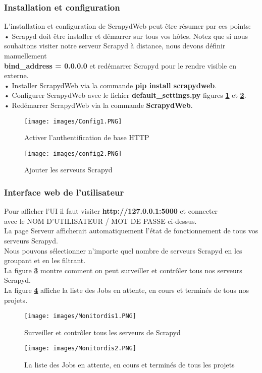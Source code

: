 \subsubsection{Installation et configuration}
\noindent L'installation et configuration de ScrapydWeb peut être résumer par ces points:\\
\indent• Scrapyd doit être installer et démarrer sur tous vos hôtes. Notez que si nous souhaitons \indent visiter notre serveur Scrapyd à distance, nous devons définir manuellement \\\indent\textbf{bind\_address = 0.0.0.0} et redémarrer Scrapyd pour le rendre visible en externe.\\
\indent• Installer ScrapydWeb via la commande \textbf{pip install scrapydweb}.\\
\indent• Configurer ScrapydWeb avec le fichier \textbf{default\_settings.py} figures \textbf{\ref{fig:config1}} et \textbf{\ref{fig:config2}}.\\
\indent• Redémarrer ScrapydWeb via la commande \textbf{ScrapydWeb}.\\
\begin{figure}[H]
    \centering
    \texttt{[image: images/Config1.PNG]}
    \caption{Activer l'authentification de base HTTP}
    \label{fig:config1}  
    \end{figure}
\begin{figure}[H]
    \centering
    \texttt{[image: images/config2.PNG]}
    \caption{Ajouter les serveurs Scrapyd}
    \label{fig:config2}  
    \end{figure}
    
\subsubsection{Interface web de l'utilisateur}
Pour afficher l'UI il faut visiter \textbf{http://127.0.0.1:5000} et connecter\\ avec le NOM D'UTILISATEUR / MOT DE PASSE ci-dessus.\\
La page Serveur afficherait automatiquement l'état de fonctionnement de tous vos serveurs Scrapyd.\\
Nous pouvons sélectionner n'importe quel nombre de serveurs Scrapyd en les groupant et en les filtrant.\\
La figure \textbf{\ref{fig:surveiller}} montre comment on peut surveiller et contrôler tous nos serveurs Scrapyd.\\
La figure \textbf{\ref{fig:Liste}} affiche la liste des Jobs en attente, en cours et terminés de tous nos projets.
\begin{figure}[H]
    \centering
    \texttt{[image: images/Monitordis1.PNG]}
    \caption{Surveiller et contrôler tous les serveurs de Scrapyd}
    \label{fig:surveiller}  
    \end{figure}
\begin{figure}[H]
    \centering
    \texttt{[image: images/Monitordis2.PNG]}
    \caption{La liste des Jobs en attente, en cours et terminés de tous les projets}
    \label{fig:Liste}  
    \end{figure}
